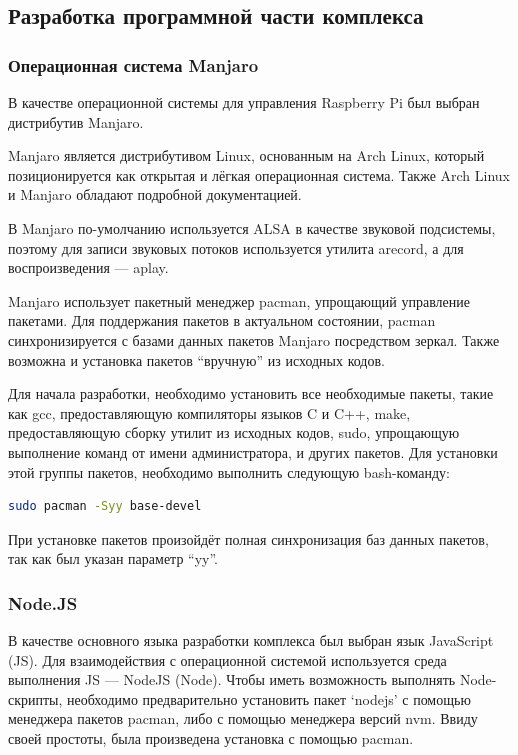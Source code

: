 \subsection{Разработка программной части комплекса}

\subsubsection{Операционная система Manjaro}
В качестве операционной системы для управления Raspberry Pi был выбран дистрибутив Manjaro.

Manjaro является дистрибутивом Linux, основанным на Arch Linux, который позиционируется как открытая и лёгкая операционная система. Также Arch Linux и Manjaro обладают подробной документацией.

В Manjaro по-умолчанию используется ALSA в качестве звуковой подсистемы, поэтому для записи звуковых потоков используется утилита arecord, а для воспроизведения --- aplay.

Manjaro использует пакетный менеджер pacman, упрощающий управление пакетами. Для поддержания пакетов в актуальном состоянии, pacman синхронизируется с базами данных пакетов Manjaro посредством зеркал. Также возможна и установка пакетов ``вручную'' из исходных кодов.

Для начала разработки, необходимо установить все необходимые пакеты, такие как gcc, предоставляющую компиляторы языков C и C++, make, предоставляющую сборку утилит из исходных кодов, sudo, упрощающую выполнение команд от имени администратора, и других пакетов. Для установки этой группы пакетов, необходимо выполнить следующую bash-команду:

\begin{lstlisting}[style=ES6, language=bash]
  sudo pacman -Syy base-devel
\end{lstlisting}

При установке пакетов произойдёт полная синхронизация баз данных пакетов, так как был указан параметр ``yy''.

\subsubsection{Node.JS}

В качестве основного языка разработки комплекса был выбран язык JavaScript (JS). Для взаимодействия с операционной системой используется среда выполнения JS --- NodeJS (Node). Чтобы иметь возможность выполнять Node-скрипты, необходимо предварительно установить пакет `nodejs' с помощью менеджера пакетов pacman, либо с помощью менеджера версий nvm. Ввиду своей простоты, была произведена установка с помощью pacman.

